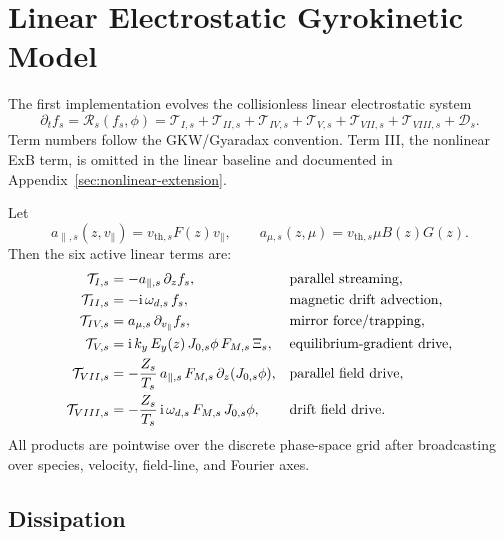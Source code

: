 \documentclass[11pt,a4paper]{article}
\newcommand{\ii}{\mathrm{i}}
\newcommand{\vpar}{v_{\parallel}}
\newcommand{\RHS}{\mathcal{R}}
\newcommand{\Dop}{\mathcal{D}}
\begin{document}
\section{Linear Electrostatic Gyrokinetic Model}

The first implementation evolves the collisionless linear electrostatic system
\begin{equation}
  \partial_t f_s
  =
  \RHS_s(f_s,\phi)
  =
  \mathcal{T}_{I,s}
  +\mathcal{T}_{II,s}
  +\mathcal{T}_{IV,s}
  +\mathcal{T}_{V,s}
  +\mathcal{T}_{VII,s}
  +\mathcal{T}_{VIII,s}
  +\Dop_s.
  \label{eq:linear-rhs}
\end{equation}
Term numbers follow the GKW/Gyaradax convention.  Term III, the nonlinear ExB term, is omitted in the linear baseline and documented in Appendix~\ref{sec:nonlinear-extension}.

Let
\begin{equation}
  a_{\parallel,s}(z,\vpar)=v_{\mathrm{th},s}F(z)\vpar,
  \qquad
  a_{\mu,s}(z,\mu)=v_{\mathrm{th},s}\mu B(z)G(z).
  \label{eq:adv-speeds}
\end{equation}
Then the six active linear terms are:
\begin{align}
  \mathcal{T}_{I,s}
  &=
  -a_{\parallel,s}\,\partial_z f_s,
  &&\hbox{parallel streaming,}
  \label{eq:term-I}
  \\
  \mathcal{T}_{II,s}
  &=
  -\ii\,\omega_{d,s}\,f_s,
  &&\hbox{magnetic drift advection,}
  \label{eq:term-II}
  \\
  \mathcal{T}_{IV,s}
  &=
  a_{\mu,s}\,\partial_{\vpar} f_s,
  &&\hbox{mirror force/trapping,}
  \label{eq:term-IV}
  \\
  \mathcal{T}_{V,s}
  &=
  \ii\,k_y\,E_y(z)\,
  J_{0,s}\phi\,
  F_{M,s}\,\Xi_s,
  &&\hbox{equilibrium-gradient drive,}
  \label{eq:term-V}
  \\
  \mathcal{T}_{VII,s}
  &=
  -\frac{Z_s}{T_s}\,
  a_{\parallel,s}\,
  F_{M,s}\,
  \partial_z(J_{0,s}\phi),
  &&\hbox{parallel field drive,}
  \label{eq:term-VII}
  \\
  \mathcal{T}_{VIII,s}
  &=
  -\frac{Z_s}{T_s}\,
  \ii\,\omega_{d,s}\,
  F_{M,s}\,
  J_{0,s}\phi,
  &&\hbox{drift field drive.}
  \label{eq:term-VIII}
\end{align}
All products are pointwise over the discrete phase-space grid after broadcasting over species, velocity, field-line, and Fourier axes.

\subsection{Dissipation}
\end{document}
